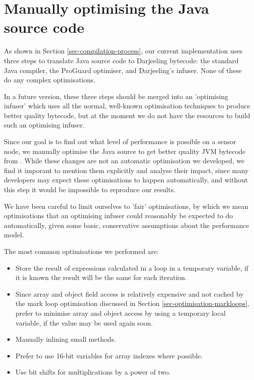 \section{Manually optimising the Java source code}
\label{sec-optimisations-manual-java-source-optimisation}
As shown in Section \ref{sec-compilation-process}, our current implementation uses three steps to translate Java source code to Darjeeling bytecode: the standard Java compiler, the ProGuard optimiser, and Darjeeling's infuser. None of these do any complex optimisations. 

In a future version, these three steps should be merged into an 'optimising infuser' which uses all the normal, well-known optimisation techniques to produce better quality bytecode, but at the moment we do not have the resources to build such an optimising infuser.

Since our goal is to find out what level of performance is possible on a sensor node, we manually optimise the Java source to get better quality JVM bytecode from . While these changes are not an automatic optimisation we developed, we find it imporant to mention them explicitly and analyse their impact, since many developers may expect these optimisations to happen automatically, and without this step it would be impossible to reproduce our results.

We have been careful to limit ourselves to 'fair' optimisations, by which we mean optimisations that an optimising infuser could reasonably be expected to do automatically, given some basic, conservative assumptions about the performance model. 

The most common optimisations we performed are:
\begin{itemize}
	\item Store the result of expressions calculated in a loop in a temporary variable, if it is known the result will be the same for each iteration.
	\item Since array and object field access is relatively expensive and not cached by the mark loop optimisation discussed in Section \ref{sec-optimisation-markloops}, prefer to minimise array and object access by using a temporary local variable, if the value may be used again soon.
	\item Manually inlining small methods.
	\item Prefer to use 16-bit variables for array indexes where possible.
	\item Use bit shifts for multiplications by a power of two.
\end{itemize}

